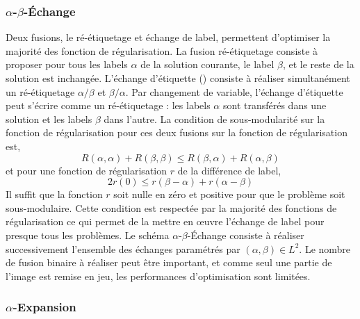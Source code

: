 \documentclass[../main/These_Mathias_Paget.tex]{subfiles}
\begin{document}
\subsubsection{$\alpha$-$\beta$-Échange}
\label{sss:swap}
Deux fusions, le ré-étiquetage et échange de label, permettent d'optimiser la majorité des fonction de régularisation. La fusion ré-étiquetage consiste à proposer pour tous les labels $\alpha$ de la solution courante, le label $\beta$, et le reste de la solution est inchangée. L'échange d'étiquette (\cite{Veksler99t}) consiste à réaliser simultanément un ré-étiquetage $\alpha/\beta$ et $\beta/\alpha$. Par changement de variable, l'échange d'étiquette peut s'écrire comme un ré-étiquetage : les labels $\alpha$ sont transférés dans une solution et les labels $\beta$ dans l'autre. La condition de sous-modularité sur la fonction de régularisation pour ces deux fusions sur la fonction de régularisation est,
	\begin{equation}
	\label{eq:reet}
	R(\alpha,\alpha) + R(\beta,\beta) \leq R(\beta,\alpha) + R(\alpha,\beta)	
	\end{equation}
	et pour une fonction de régularisation $r$ de la différence de label,
	\begin{equation}
	\label{eq:reet2}
	2r(0) \leq r(\beta-\alpha) + r(\alpha-\beta)	
	\end{equation}
	Il suffit que la fonction $r$ soit nulle en zéro et positive pour que le problème soit sous-modulaire. Cette condition est respectée par la majorité des fonctions de régularisation ce qui permet de la mettre en œuvre l’échange de label pour presque tous les problèmes. Le schéma $\alpha$-$\beta$-Échange consiste à réaliser successivement l'ensemble des échanges paramétrés par $(\alpha,\beta) \in L^2$. Le nombre de fusion binaire à réaliser peut être important, et comme seul une partie de l'image est remise en jeu, les performances d'optimisation sont limitées.

\subsubsection{$\alpha$-Expansion}
\label{sss:alp_exp}
\end{document}
